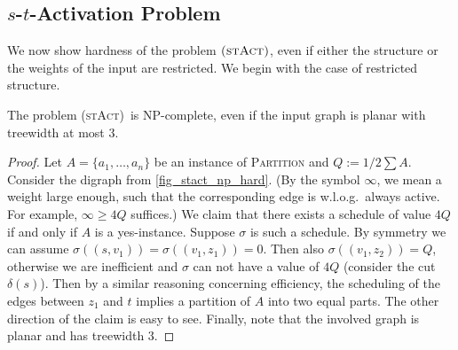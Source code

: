 \documentclass[runningheads]{llncs}
\numberwithin{equation}{section}
\newcommand{\set}[1]{\{ #1 \}}
\newcommand{\fromto}[2]{\set{#1, \ldots, #2}}
\newcommand{\stact}{\textsc{(stAct)}}
\begin{document}
\subsection{$s$-$t$-Activation Problem}
We now show hardness of the problem $\stact$, even if either the structure or the weights of the input are restricted. We begin with the case of restricted structure.

\begin{theorem}
\label{thm_stact_np_hard}
The problem \stact\ is NP-complete, even if the input graph is planar with treewidth at most 3.
\end{theorem}

\begin{proof}
Let $A = \fromto{a_1}{a_n}$ be an instance of \textsc{Partition} and $Q := 1/2 \sum A$. Consider the digraph from \cref{fig_stact_np_hard}. (By the symbol $\infty$, we mean a weight large enough, such that the corresponding edge is w.l.o.g.\ always active. For example, $\infty \geq 4Q$ suffices.) We claim that there exists a schedule of value $4Q$ if and only if $A$ is a yes-instance. Suppose $\sigma$ is such a schedule. By symmetry we can assume $\sigma((s,v_1)) = \sigma((v_1, z_1)) = 0$. Then also $\sigma((v_1, z
_2)) = Q$, otherwise we are inefficient and $\sigma$ can not have a value of $4Q$ (consider the cut $\delta(s)$). Then by a similar reasoning concerning efficiency, the scheduling of the edges between $z_1$ and $t$ implies a partition of $A$ into two equal parts. The other direction of the claim is easy to see. Finally, note that the involved graph is 
planar and has treewidth 3.
\end{proof}
\end{document}
